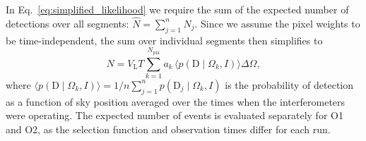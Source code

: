 \documentclass[usenatbib,useAMS]{mnras}
\newcommand{\Npix}{\ensuremath{N_\mathrm{pix}}}
\begin{document}
In Eq.~\eqref{eq:simplified_likelihood} we require the sum of the expected
number of detections over all segments: $\hat{N} = \sum_{j=1}^{n} \hat{N}_j$.
Since we assume the pixel weights to be time-independent, the sum over
individual segments then simplifies to
%
\begin{equation}
    \hat{N}
    =
    V_{\mathrm{L}} T \sum_{k=1}^{\Npix} a_k\,
    \langle p\left(\bm{\mathrm{D}} \mid \Omega_k, I \right) \rangle
    \Delta\Omega,
\end{equation}
% 
where $\langle p\left(\bm{\mathrm{D}} \mid \Omega_k, I \right) \rangle
=
1 / n \sum_{j=1}^{n} p\left(\bm{\mathrm{D}}_j \mid \Omega_k, I \right)$
is the probability of detection as a function of sky position averaged over the
times when the interferometers were operating. The expected number of events is
evaluated separately for O1 and O2, as the selection function and observation
times differ for each run.
\end{document}
